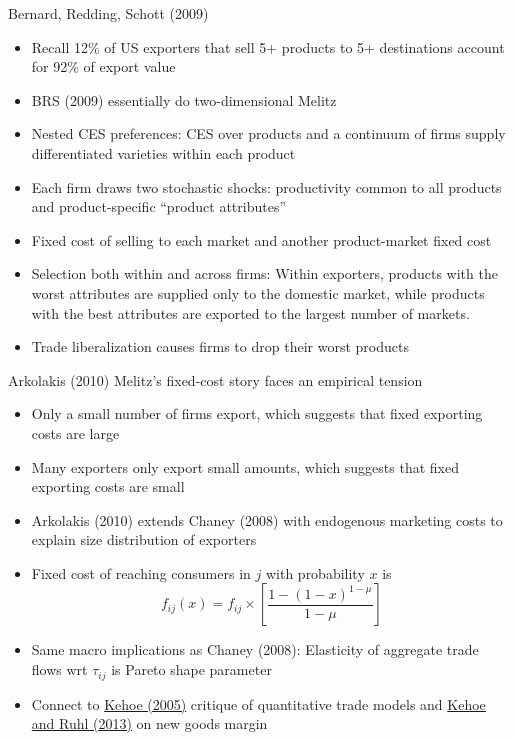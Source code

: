 \documentclass[10pt,notes=hide]{beamer}
\begin{document}
\begin{frame}{Bernard, Redding, Schott (2009)}
\begin{itemize}
	\item Recall 12\% of US exporters that sell 5+ products to 5+ destinations account for 92\% of export value
	\item BRS (2009) essentially do two-dimensional Melitz
	\item Nested CES preferences: CES over products and a continuum of firms supply differentiated varieties within each product
	\item Each firm draws two stochastic shocks: productivity common to all products and product-specific ``product attributes''
	\item Fixed cost of selling to each market and another product-market fixed cost
	\item Selection both within and across firms: Within exporters, products with the worst attributes are supplied only to the domestic market, while products with the best attributes are exported to the largest number of markets.
	\item Trade liberalization causes firms to drop their worst products
\end{itemize}
\end{frame}
\begin{frame}{Arkolakis (2010)}
Melitz's fixed-cost story faces an empirical tension
\begin{itemize}
	\item Only a small number of firms export, which suggests that fixed exporting costs are large
	\item Many exporters only export small amounts, which suggests that fixed exporting costs are small
	\item Arkolakis (2010) extends Chaney (2008) with endogenous marketing costs to explain size distribution of exporters
	\item Fixed cost of reaching consumers in $j$ with probability $x$ is
	$$
	f_{ij}(x) = f_{ij} \times \left[\frac{1-(1-x)^{1-\mu}}{1-\mu}\right]
	$$
	\item Same macro implications as Chaney (2008): Elasticity of aggregate trade flows wrt $\tau_{ij}$ is Pareto shape parameter
  \item Connect to \href{https://www.minneapolisfed.org/research/staff-reports/an-evaluation-of-the-performance-ofapplied-general-equilibrium-models-of-the-impact-of-nafta}{Kehoe (2005)} critique of quantitative trade models and \href{https://www.journals.uchicago.edu/doi/full/10.1086/670272}{Kehoe and Ruhl (2013)} on new goods margin
\end{itemize}
\end{frame}
\end{document}
